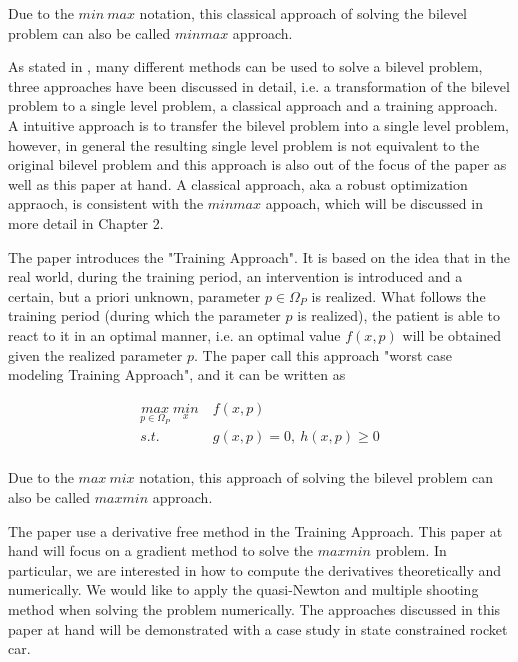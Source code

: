 \documentclass  [
  paper    = a4,
  BCOR     = 10mm,
  twoside,
  fontsize = 12pt,
  fleqn,
  toc      = bibnumbered,
  toc      = listofnumbered,
  numbers  = noendperiod,
  headings = normal,
  listof   = leveldown,
  version  = 3.03
]                                       {scrreprt}
\newcommand{\<}{\langle}
\renewcommand{\>}{\rangle}
\begin{document}
   
   Due to the $min \ max$ notation, this classical approach of solving the bilevel problem can also be called $min max$ approach. 
   
   As stated in \cite{MatSch22}, many different methods can be used to solve a bilevel problem, three approaches have been discussed in detail, i.e. a transformation of the bilevel problem to a single level problem, a classical approach and a training approach. A intuitive approach is to transfer the bilevel problem into a single level problem, however, in general the resulting single level problem is not equivalent to the original bilevel problem and this approach is also out of the focus of the paper \cite{MatSch22} as well as this paper at hand. A classical approach, aka a robust optimization appraoch, is consistent with the $minmax$ appoach, which will be discussed in more detail in Chapter 2.
   
   The paper \cite{MatSch22} introduces the "Training Approach".  It is based on the idea that in the real world, during the training period, an intervention is introduced and a certain, but a priori unknown, parameter $p \in \Omega_P$ is realized. What follows the training period (during which the parameter $p$ is realized), the patient is able to react to it in an optimal manner, i.e. an optimal value $f(x,p)$ will be obtained given the  realized parameter $p$. The paper \cite{MatSch22} call this approach "worst case modeling Training Approach", and it can be written as 
   
   \begin{equation}
   \begin{aligned}
   \underset{p \in \Omega_P}{max} \ \underset{x}{min} & \  f(x,p) \\ 
   s.t.  & \  g(x, p) = 0, \  h(x,p)  \geq  0 \\
   \end{aligned}
   \label{maxmin}
   \end{equation}
   
   Due to the $max \ mix$ notation, this approach of solving the bilevel problem can also be called $max min$ approach. 
   
   The paper \cite{MatSch22} use a derivative free method in the Training Approach. This paper at hand will focus on a gradient method to solve the $maxmin$ problem.  In particular, we are interested in how to compute the derivatives theoretically and numerically.  We would like to apply the quasi-Newton and multiple shooting method when solving the problem numerically. The approaches discussed in this paper at hand will be demonstrated with a case study in state constrained rocket car. 
   
\end{document}
